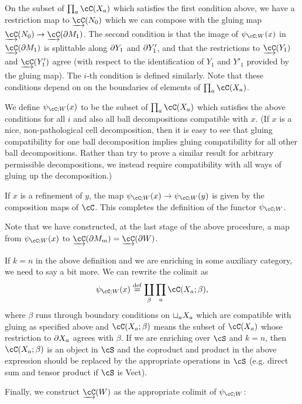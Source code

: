 On the subset of $\prod_a \cC(X_a)$ which satisfies the first condition above, we have a restriction
map to $\cl\cC(N_0)$ which we can compose with the gluing map 
$\cl\cC(N_0) \to \cl\cC(\bd M_1)$.
The second condition is that the image of $\psi_{\cC;W}(x)$ in $\cl\cC(\bd M_1)$ is splittable
along $\partial Y_1$ and $\partial Y'_1$, and that the restrictions to $\cl\cC(Y_1)$ and $\cl\cC(Y'_1)$ agree
(with respect to the identification of $Y_1$ and $Y'_1$ provided by the gluing map). 
The $i$-th condition is defined similarly.
Note that these conditions depend on on the boundaries of elements of $\prod_a \cC(X_a)$.

We define $\psi_{\cC;W}(x)$ to be the subset of $\prod_a \cC(X_a)$ which satisfies the 
above conditions for all $i$ and also all 
ball decompositions compatible with $x$.
(If $x$ is a nice, non-pathological cell decomposition, then it is easy to see that gluing
compatibility for one ball decomposition implies gluing compatibility for all other ball decompositions.
Rather than try to prove a similar result for arbitrary
permissible decompositions, we instead require compatibility with all ways of gluing up the decomposition.)

If $x$ is a refinement of $y$, the map $\psi_{\cC;W}(x) \to \psi_{\cC;W}(y)$ 
is given by the composition maps of $\cC$.
This completes the definition of the functor $\psi_{\cC;W}$.

Note that we have constructed, at the last stage of the above procedure, 
a map from $\psi_{\cC;W}(x)$ to $\cl\cC(\bd M_m) = \cl\cC(\bd W)$.

If $k=n$ in the above definition and we are enriching in some auxiliary category, 
we need to say a bit more.
We can rewrite the colimit as
\[  %
	\psi_{\cC;W}(x) \deq \coprod_\beta \prod_a \cC(X_a; \beta) ,
\]  %
where $\beta$ runs through 
boundary conditions on $\sqcup_a X_a$ which are compatible with gluing as specified above
and $\cC(X_a; \beta)$
means the subset of $\cC(X_a)$ whose restriction to $\partial X_a$ agrees with $\beta$.
If we are enriching over $\cS$ and $k=n$, then $\cC(X_a; \beta)$ is an object in 
$\cS$ and the coproduct and product in the above expression should be replaced by the appropriate
operations in $\cS$ (e.g. direct sum and tensor product if $\cS$ is Vect).

Finally, we construct $\cl{\cC}(W)$ as the appropriate colimit of $\psi_{\cC;W}$:

